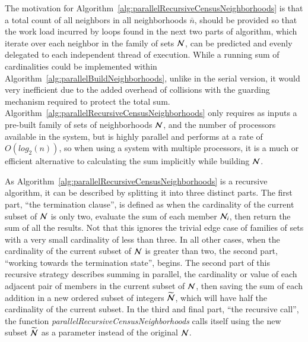 The motivation for Algorithm~\ref{alg:parallelRecursiveCensusNeighborhoods} is that a total count of all neighbors in all neighborhoods $\bar{n}$, should be provided so that the work load incurred by loops found in the next two parts of  algorithm, which iterate over each neighbor in the family of sets $\mathcal{N}$, can be predicted and evenly delegated to each independent thread of execution. While a running sum of cardinalities could be implemented within Algorithm~\ref{alg:parallelBuildNeighborhoods}, unlike in the serial version, it would very inefficient due to the added overhead of collisions with the guarding mechanism required to protect the total sum.  Algorithm~\ref{alg:parallelRecursiveCensusNeighborhoods} only requires as inputs a pre-built family of sets of neighborhoods $\mathcal{N}$, and the number of processors available in the system, but is highly parallel and performs at a rate of $O(log_2(n))$, so when using a system with multiple processors, it is a much or efficient alternative to calculating the sum implicitly while building $\mathcal{N}$.

As Algorithm~\ref{alg:parallelRecursiveCensusNeighborhoods} is a recursive algorithm, it can be described by splitting it into three distinct parts. The first part, ``the termination clause'', is defined as when the cardinality of the current subset of $\mathcal{N}$ is only two, evaluate the sum of each member $\mathcal{N}_i$, then return the sum of all the results. Not that this ignores the trivial edge case of families of sets with a very small cardinality of less than three. In all other cases, when the cardinality of the current subset of $\mathcal{N}$ is greater than two, the second part, ``working towards the termination state'', begins. The second part of this recursive strategy describes summing in parallel, the cardinality or value of each adjacent pair of members in the current subset of $\mathcal{N}$, then saving the sum of each addition in a new ordered subset of integers $\widetilde{\mathcal{N}}$, which will have half the cardinality of the current subset. In the third and final part, ``the recursive call'', the function \textit{parallelRecursiveCensusNeighborhoods} calls itself using the new subset $\widetilde{\mathcal{N}}$ as a parameter instead of the original $\mathcal{N}$.


